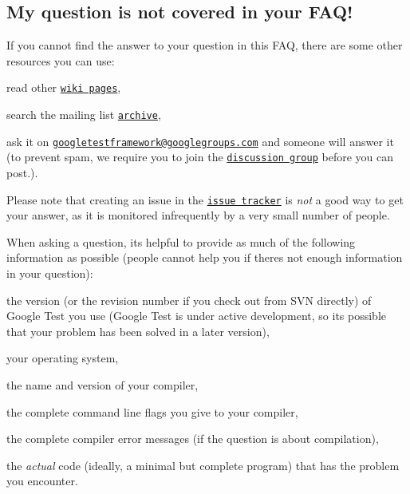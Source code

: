 \subsection*{My question is not covered in your F\+A\+Q!}

If you cannot find the answer to your question in this F\+AQ, there are some other resources you can use\+:


\begin{DoxyEnumerate}
\item read other \href{http://code.google.com/p/googletest/w/list}{\tt wiki pages},
\end{DoxyEnumerate}
\begin{DoxyEnumerate}
\item search the mailing list \href{http://groups.google.com/group/googletestframework/topics}{\tt archive},
\end{DoxyEnumerate}
\begin{DoxyEnumerate}
\item ask it on \href{mailto:googletestframework@googlegroups.com}{\tt googletestframework@googlegroups.\+com} and someone will answer it (to prevent spam, we require you to join the \href{http://groups.google.com/group/googletestframework}{\tt discussion group} before you can post.).
\end{DoxyEnumerate}

Please note that creating an issue in the \href{http://code.google.com/p/googletest/issues/list}{\tt issue tracker} is {\itshape not} a good way to get your answer, as it is monitored infrequently by a very small number of people.

When asking a question, it\textquotesingle{}s helpful to provide as much of the following information as possible (people cannot help you if there\textquotesingle{}s not enough information in your question)\+:


\begin{DoxyItemize}
\item the version (or the revision number if you check out from S\+VN directly) of Google Test you use (Google Test is under active development, so it\textquotesingle{}s possible that your problem has been solved in a later version),
\item your operating system,
\item the name and version of your compiler,
\item the complete command line flags you give to your compiler,
\item the complete compiler error messages (if the question is about compilation),
\item the {\itshape actual} code (ideally, a minimal but complete program) that has the problem you encounter. 
\end{DoxyItemize}